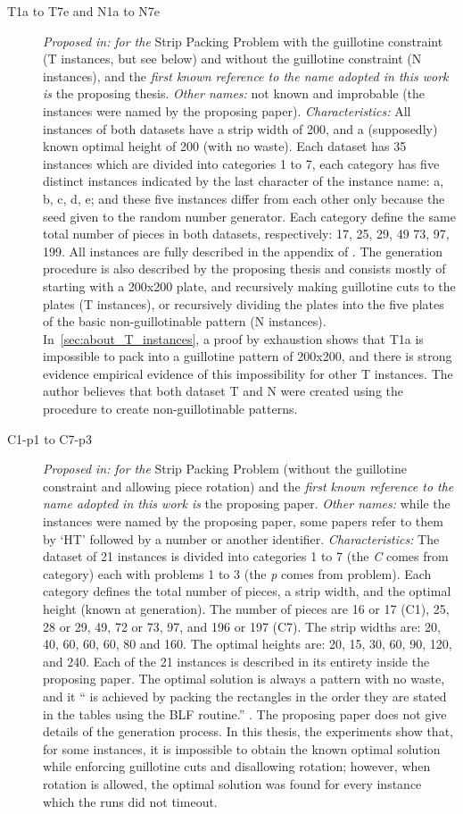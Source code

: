 \documentclass[ppgc,tese,english,formais,babel]{iiufrgs}
\begin{document}
\begin{description}
\item [T1a to T7e and N1a to N7e] \emph{Proposed in:} \citet{hopper_thesis} \emph{for the} Strip Packing Problem with the guillotine constraint (T instances, but see below) and without the guillotine constraint (N instances), and the \emph{first known reference to the name adopted in this work is} the proposing thesis. \emph{Other names:} not known and improbable (the instances were named by the proposing paper). \emph{Characteristics: } All instances of both datasets have a strip width of 200, and a (supposedly) known optimal height of 200 (with no waste). Each dataset has 35 instances which are divided into categories 1 to 7, each category has five distinct instances indicated by the last character of the instance name: a, b, c, d, e; and these five instances differ from each other only because the seed given to the random number generator. Each category define the same total number of pieces in both datasets, respectively: 17, 25, 29, 49 73, 97, 199. All instances are fully described in the appendix of \citet{hopper_thesis}. The generation procedure is also described by the proposing thesis and consists mostly of starting with a 200x200 plate, and recursively making guillotine cuts to the plates (T instances), or recursively dividing the plates into the five plates of the basic non-guillotinable pattern (N instances). In~\cref{sec:about_T_instances}, a proof by exhaustion shows that T1a is impossible to pack into a guillotine pattern of 200x200, and there is strong evidence empirical evidence of this impossibility for other T instances. The author believes that both dataset T and N were created using the procedure to create non-guillotinable patterns.
\item[C1-p1 to C7-p3] \emph{Proposed in:} \citet{hopper:2001} \emph{for the} Strip Packing Problem (without the guillotine constraint and allowing piece rotation) and the \emph{first known reference to the name adopted in this work is} the proposing paper. \emph{Other names:} while the instances were named by the proposing paper, some papers refer to them by `HT' followed by a number or another identifier\cite{stephane:sat:2010,fleszar:2016}. \emph{Characteristics:} The dataset of 21 instances is divided into categories 1 to 7 (the \emph{C} comes from category) each with problems 1 to 3 (the \emph{p} comes from problem). Each category defines the total number of pieces, a strip width, and the optimal height (known at generation). The number of pieces are 16 or 17 (C1), 25, 28 or 29, 49, 72 or 73, 97, and 196 or 197 (C7). The strip widths are: 20, 40, 60, 60, 60, 80 and 160. The optimal heights are: 20, 15, 30, 60, 90, 120, and 240. Each of the 21 instances is described in its entirety inside the proposing paper. The optimal solution is always a pattern with no waste, and it `` is achieved by packing the rectangles in the order they are stated in the tables using the BLF routine.'' \citep{hopper:2001}. The proposing paper does not give details of the generation process. In this thesis, the experiments show that, for some instances, it is impossible to obtain the known optimal solution while enforcing guillotine cuts and disallowing rotation; however, when rotation is allowed, the optimal solution was found for every instance which the runs did not timeout.

\end{description}
\end{document}
